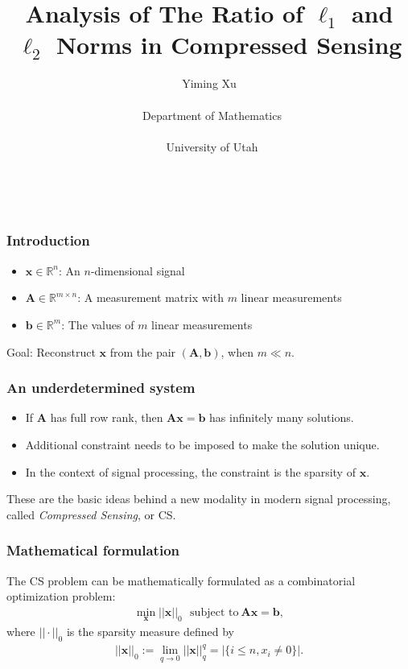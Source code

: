 \documentclass[11pt]{beamer}
\title{Analysis of The Ratio of $\ell_1$ and $\ell_2$ Norms in Compressed Sensing}
\author{Yiming Xu 
\\ \ \\ \ Department of Mathematics
\\ \ \\ \  University of Utah\\ \ \\ \
}
\date{}
\def\R{{\mathbb R}}
\def\R{{\mathbb R}}
\def\A{{\mathbf A}}
\def\x{{\mathbf x}}
\def\b{{\mathbf b}}
\begin{document}
\begin{frame}
  \titlepage 
\end{frame}

\begin{frame}
\frametitle{Introduction}
\begin{itemize}
\item $\x\in\R^n$: An $n$-dimensional signal
\item $\A\in\R^{m\times n}$: A measurement matrix with $m$ linear measurements
\item $\b\in\R^m$: The values of $m$ linear measurements
\end{itemize}

\bigskip 

\begin{center}

Goal: Reconstruct $\x$ from the pair $(\A, \b)$, when $m\ll n$. 
\end{center}

\end{frame}


\begin{frame}
\frametitle{An underdetermined system}

\begin{itemize}
\item If $\A$ has full row rank, then $\A\x=\b$ has infinitely many solutions.

\item Additional constraint needs to be imposed to make the solution unique. 

\item In the context of signal processing, the constraint is the {\color{red}sparsity} of $\x$. 
\end{itemize} 


\medskip

These are the basic ideas behind a new modality in modern signal processing, called \emph{Compressed Sensing}, or CS.  



\end{frame}

\begin{frame}
\frametitle{Mathematical formulation}
\centering

The CS problem can be mathematically formulated as a combinatorial optimization problem:
\begin{align*}
\min_{\x}||\x||_0\ \ \ \text{subject to}\ \A\x=\b, 
\end{align*}
where $|| \cdot||_0$ is the sparsity measure defined by
\begin{align*}
||\x||_0:=\lim_{q\rightarrow 0}||\x||_q^q=|\{i\leq n, x_i\neq 0\}|.
\end{align*}


\end{frame}
\end{document}
